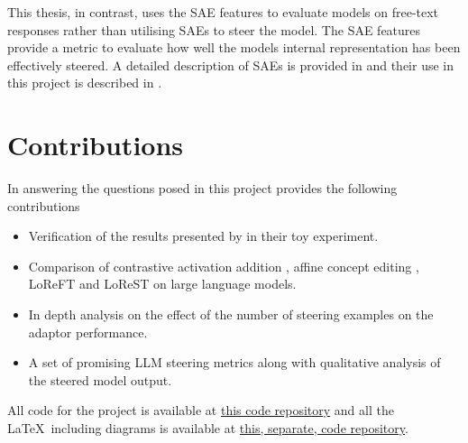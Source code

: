 This thesis, in contrast, uses the SAE features to evaluate models on free-text responses rather than utilising SAEs to steer the model.
The SAE features provide a metric to evaluate how well the models internal representation has been effectively steered.
A detailed description of SAEs is provided in  and their use in this project is described in .

\section{Contributions}
\label{sec:contributions}

In answering the questions posed in  this project provides the following contributions
\begin{itemize}[nolistsep]
    \item Verification of the results presented by \citet{steering-clear} in their toy experiment.
    \item Comparison of contrastive activation addition \citep[CAA]{caa}, affine concept editing \citep[ACE]{ace}, LoReFT and LoReST on large language models.
    \item In depth analysis on the effect of the number of steering examples on the adaptor performance.
    \item A set of promising LLM steering metrics along with qualitative analysis of the steered model output.
\end{itemize}

All code for the project is available at \href{https://github.com/skyepurchase/msc_thesis}{this code repository} and all the \LaTeX~including diagrams is available at \href{https://github.com/skyepurchase/msc_report}{this, separate, code repository}.
